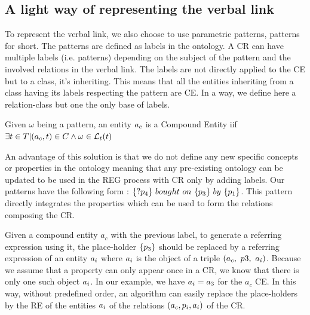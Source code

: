 \subsection{A light way of representing the verbal link}

To represent the verbal link, we also choose to use parametric patterns, patterns for short. The patterns are defined as labels in the ontology. A CR can have multiple labels (i.e. patterns) depending on the subject of the pattern and the involved relations in the verbal link. The labels are not directly applied to the CE but to a class, it's inheriting. This means that all the entities inheriting from a class having its labels respecting the pattern are CE. In a way, we define here a relation-class but one the only base of labels.

\begin{theorem} 
\label{the:compound_relation}
Given $\omega$ being a pattern, an entity $a_c$ is a Compound Entity iif $\exists t \in T | (a_c, t) \in C \land \omega \in \mathcal{L}_t{(t)}$
\end{theorem}

An advantage of this solution is that we do not define any new specific concepts or properties in the ontology meaning that any pre-existing ontology can be updated to be used in the REG process with CR only by adding labels. Our patterns have the following form : $\{?\property_4\}\ bought\ on\ \{\property_3\}\ by\ \{\property_1\}$. This pattern directly integrates the properties which can be used to form the relations composing the CR.

Given a compound entity $a_c$ with the previous label, to generate a referring expression using it, the place-holder $\{p_3\}$ should be replaced by a referring expression of an entity $a_i$ where $a_i$ is the object of a triple $(a_c,\ p3,\ a_i)$. Because we assume that a property can only appear once in a CR, we know that there is only one such object $a_i$. In our example, we have $a_i = a_3$ for the $a_c$ CE.
In this way, without predefined order, an algorithm can easily replace the place-holders by the RE of the entities $a_i$ of the relations $(a_c, p_i, a_i)$ of the CR.

